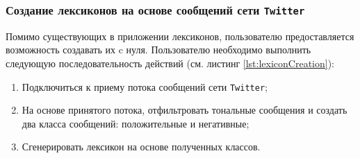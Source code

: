         \subsubsection{Создание лексиконов на основе сообщений сети
            {\tt Twitter} }
        Помимо существующих в приложении лексиконов, пользователю предоставляется
        возможность создавать их c нуля. Пользователю необходимо выполнить следующую
        последовательность действий (см. листинг \ref{lst:lexiconCreation}):
        \begin{enumerate}
            \item Подключиться к приему потока сообщений сети {\tt Twitter};
            \item На основе принятого потока, отфильтровать тональные сообщения
            и создать два класса сообщений: положительные и негативные;
            \item Сгенерировать лексикон на основе полученных классов.
        \end{enumerate}

        \lstset{style=bash}
        
